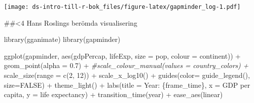 \documentclass[
]{book}
\newenvironment{Shaded}{\begin{snugshade}}{\end{snugshade}}
\newcommand{\AttributeTok}[1]{\textcolor[rgb]{0.77,0.63,0.00}{#1}}
\newcommand{\CommentTok}[1]{\textcolor[rgb]{0.56,0.35,0.01}{\textit{#1}}}
\newcommand{\ConstantTok}[1]{\textcolor[rgb]{0.00,0.00,0.00}{#1}}
\newcommand{\DecValTok}[1]{\textcolor[rgb]{0.00,0.00,0.81}{#1}}
\newcommand{\FloatTok}[1]{\textcolor[rgb]{0.00,0.00,0.81}{#1}}
\newcommand{\FunctionTok}[1]{\textcolor[rgb]{0.00,0.00,0.00}{#1}}
\newcommand{\NormalTok}[1]{#1}
\newcommand{\SpecialCharTok}[1]{\textcolor[rgb]{0.00,0.00,0.00}{#1}}
\newcommand{\StringTok}[1]{\textcolor[rgb]{0.31,0.60,0.02}{#1}}
\begin{document}
\texttt{[image: ds-intro-till-r-bok\_files/figure-latex/gapminder\_log-1.pdf]}

\#\#\textless4 Hans Roslings berömda visualisering

\begin{Shaded}
\begin{Highlighting}[]
\FunctionTok{library}\NormalTok{(gganimate)}
\FunctionTok{library}\NormalTok{(gapminder)}

\FunctionTok{ggplot}\NormalTok{(gapminder, }\FunctionTok{aes}\NormalTok{(gdpPercap, lifeExp, }\AttributeTok{size =}\NormalTok{ pop, }\AttributeTok{colour =}\NormalTok{ continent)) }\SpecialCharTok{+}
  \FunctionTok{geom\_point}\NormalTok{(}\AttributeTok{alpha =} \FloatTok{0.7}\NormalTok{) }\SpecialCharTok{+}
  \CommentTok{\#scale\_colour\_manual(values = country\_colors) +}
  \FunctionTok{scale\_size}\NormalTok{(}\AttributeTok{range =} \FunctionTok{c}\NormalTok{(}\DecValTok{2}\NormalTok{, }\DecValTok{12}\NormalTok{)) }\SpecialCharTok{+}
  \FunctionTok{scale\_x\_log10}\NormalTok{() }\SpecialCharTok{+}
  \FunctionTok{guides}\NormalTok{(}\AttributeTok{color=} \FunctionTok{guide\_legend}\NormalTok{(), }\AttributeTok{size=}\ConstantTok{FALSE}\NormalTok{) }\SpecialCharTok{+}
  \FunctionTok{theme\_light}\NormalTok{() }\SpecialCharTok{+}
  \FunctionTok{labs}\NormalTok{(}\AttributeTok{title =} \StringTok{\textquotesingle{}Year: \{frame\_time\}\textquotesingle{}}\NormalTok{, }
       \AttributeTok{x =} \StringTok{\textquotesingle{}GDP per capita\textquotesingle{}}\NormalTok{,}
       \AttributeTok{y =} \StringTok{\textquotesingle{}life expectancy\textquotesingle{}}\NormalTok{) }\SpecialCharTok{+}
  \FunctionTok{transition\_time}\NormalTok{(year) }\SpecialCharTok{+}
  \FunctionTok{ease\_aes}\NormalTok{(}\StringTok{\textquotesingle{}linear\textquotesingle{}}\NormalTok{)}
\end{Highlighting}
\end{Shaded}
\end{document}

